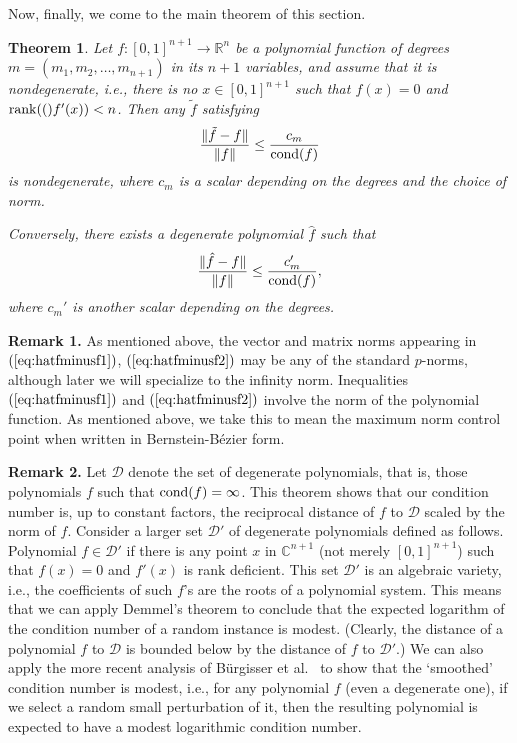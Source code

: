 \documentclass{article}
\newcommand{\cond}[1]{\mathop{\rm{cond}}(#1)}
\newcommand\eref[1]{$(\ref{#1})$}
\newtheorem{theorem}{Theorem}[section]
\newcommand{\rank}[1]{\mathop{\rm{rank}}(#1)}
\begin{document}
Now, finally, we come to the main theorem of this
section.
\begin{theorem}
Let $f:[0,1]^{n+1}\rightarrow\mathbb{R}^{n}$ be a polynomial function of degrees 
$m=(m_1,m_2,\ldots, m_{n+1})$ in its $n+1$ variables, and assume that it
is nondegenerate, i.e., there is no $x\in[0,1]^{n+1}$ such that
$f(x)=0$ and $\rank(f'(x))<n$.
Then any $\tilde f$ satisfying
\begin{equation}
\frac{\Vert \tilde f-f\Vert}{\Vert f\Vert} \le \frac{c_m}{\cond{f}}
\label{eq:hatfminusf1}
\end{equation}
is nondegenerate, where $c_m$ is a scalar depending on the degrees and the choice of norm.

Conversely,
there exists a degenerate 
polynomial $\hat f$ such that
\begin{equation}
\frac{\Vert \hat f - f\Vert}{\Vert f\Vert}
\le \frac{ c_m'}{\cond{f}},
\label{eq:hatfminusf2}
\end{equation}
where
$c_m'$ is another scalar depending on the degrees.
\label{thm:disttodegen}
\end{theorem}


\noindent
{\bf Remark 1.} 
As mentioned above, the vector and matrix norms appearing in 
\eref{eq:hatfminusf1}, \eref{eq:hatfminusf2}
may be any of the standard $p$-norms, although later we will specialize
to the infinity norm.
Inequalities \eref{eq:hatfminusf1} and \eref{eq:hatfminusf2} involve
the norm of the polynomial function.  
As mentioned above, we take this to mean the maximum norm control point
when written in Bernstein-B\'ezier form.  

\noindent
{\bf Remark 2.}  Let $\mathcal{D}$ denote the set of 
degenerate polynomials, that is, those polynomials $f$
such that $\cond{f}=\infty$.
This theorem shows that 
our condition number is, up to constant factors,
the reciprocal distance of
$f$ to $\mathcal{D}$ scaled by the norm of $f$.
Consider a larger set $\mathcal{D}'$
of degenerate polynomials defined as follows.
Polynomial $f\in\mathcal{D}'$ if
there is any point $x$ in $\mathbb{C}^{n+1}$ (not merely $[0,1]^{n+1}$)
such that $f(x)=0$ and $f'(x)$ is rank deficient. This set 
$\mathcal{D'}$ is an algebraic variety, i.e., the coefficients of such $f$'s are
the roots of a polynomial system.  This means that we can apply
Demmel's theorem \cite{Demmel} to conclude that the 
expected logarithm of
the condition number of a random instance is modest. (Clearly, the distance of 
a polynomial $f$ to
$\mathcal{D}$ is bounded below by the distance of $f$ to $\mathcal{D}'$.)
 We can also apply the more
recent analysis of B\"urgisser et al.\ \cite{burgisser}
to show that the `smoothed'
condition number \cite{spielman} is modest, i.e., for any polynomial $f$
(even a degenerate one), if we select a random small perturbation
of it, then the resulting polynomial is expected to have
a modest logarithmic condition number.
\end{document}
